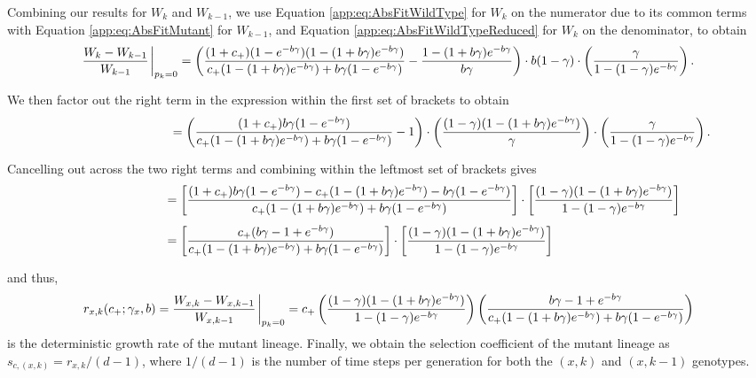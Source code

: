 \documentclass[9pt,twocolumn,twoside,lineno]{gsajnl}
\begin{document}
Combining our results for $W_k$ and $W_{k-1}$, we use Equation \eqref{app:eq:AbsFitWildType} for $W_k$ on the numerator due to its common terms with Equation \eqref{app:eq:AbsFitMutant} for $W_{k-1}$, and Equation \eqref{app:eq:AbsFitWildTypeReduced} for $W_k$ on the denominator, to obtain
\[
\begin{aligned}
\frac{W_{k}-W_{k-1}}{W_{k-1}}\eval_{p_k=0} &= \left( \frac{(1+c_+)(1-e^{-b\gamma})(1-(1+b\gamma)e^{-b\gamma})}{c_+(1-(1+b\gamma)e^{-b\gamma}) + b\gamma(1-e^{-b\gamma})} - \frac{1-(1+b\gamma)e^{-b\gamma }}{ b\gamma} \right) \cdot b(1-\gamma) \cdot \left(\frac{\gamma}{1-(1-\gamma)e^{-b\gamma}}\right).\\[4pt]
\end{aligned}
\]
We then factor out the right term in the expression within the first set of brackets to obtain
\[
\begin{aligned}
\hspace{1.15in} &= \left( \frac{(1+c_+) b\gamma (1-e^{-b\gamma})}{c_+(1-(1+b\gamma)e^{-b\gamma}) + b\gamma(1-e^{-b\gamma})} - 1 \right) \cdot \left(\frac{(1-\gamma)(1-(1+b\gamma)e^{-b\gamma })}{\gamma} \right) \cdot \left(\frac{\gamma}{1-(1-\gamma)e^{-b\gamma }}\right).\\[4pt] %
\end{aligned}
\]
Cancelling out across the two right terms and combining within the leftmost set of brackets gives
\[
\begin{aligned}
\hspace{0.75in}&= \left[ \frac{(1+c_+) b\gamma (1-e^{-b\gamma})-c_+(1-(1+b\gamma)e^{-b\gamma}) - b\gamma(1-e^{-b\gamma})}{c_+(1-(1+b\gamma)e^{-b\gamma}) + b\gamma(1-e^{-b\gamma})} \right] \cdot \left[\frac{(1-\gamma)(1-(1+b\gamma)e^{-b\gamma })}{1-(1-\gamma)e^{-b\gamma}}\right]\\[4pt]
&= \left[ \frac{c_+(b\gamma -1+e^{-b\gamma})}{c_+(1-(1+b\gamma)e^{-b\gamma}) + b\gamma(1-e^{-b\gamma})} \right] \cdot \left[\frac{(1-\gamma)(1-(1+b\gamma)e^{-b\gamma })}{1-(1-\gamma)e^{-b\gamma}}\right]\\[4pt]
\end{aligned}
\]
and thus, 
\begin{equation} \label{eq:compSelCoeff}
r_{x,k}(c_+;\gamma_{x},b)=\frac{W_{x,k}-W_{x,k-1}}{W_{x,k-1}}\eval_{p_k=0}=c_+ \left(\frac{(1-\gamma)(1-(1+b\gamma)e^{-b\gamma})}{1-(1-\gamma)e^{-b\gamma}}\right)\left( \frac{b\gamma-1+e^{-b\gamma}}{{c_+(1-(1+b\gamma)e^{-b\gamma})}+{b\gamma(1-e^{-b\gamma})}}\right)
\end{equation}
is the deterministic growth rate of the mutant lineage. Finally, we obtain the selection coefficient of the mutant lineage as $s_{c,(x,k)} = r_{x,k}/(d -1)$, where $1/(d-1)$ is the number of time steps per generation for both the $(x,k)$ and $(x,k-1)$ genotypes. \\
\end{document}
